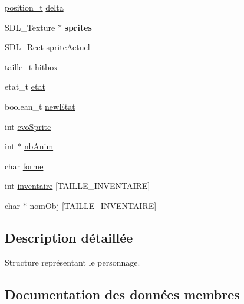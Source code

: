 \begin{DoxyCompactItemize}
\item 
\hyperlink{structposition__s}{position\+\_\+t} \hyperlink{structpersonnage__s_a09fb83af37953227050f9ced0410f032}{delta}
\item 
\mbox{\label{structpersonnage__s_a97da32596524755cba3ba76782ab0205}} 
S\+D\+L\+\_\+\+Texture $\ast$ {\bfseries sprites}
\item 
S\+D\+L\+\_\+\+Rect \hyperlink{structpersonnage__s_afa75822afebdaf61725b7f87c86d5922}{sprite\+Actuel}
\item 
\hyperlink{structtaille__s}{taille\+\_\+t} \hyperlink{structpersonnage__s_a4a6fd4db944c59eaf1c4006f7e0b533c}{hitbox}
\item 
etat\+\_\+t \hyperlink{structpersonnage__s_a2d91f0a1a2e44164875be806c7a456cc}{etat}
\item 
boolean\+\_\+t \hyperlink{structpersonnage__s_ad9c2e07633c2a40855b169b4b677009f}{new\+Etat}
\item 
int \hyperlink{structpersonnage__s_a47750ce89c5dcdb6844e0a98afd5fd75}{evo\+Sprite}
\item 
int $\ast$ \hyperlink{structpersonnage__s_a05aa3037a7469f58464094d2bd2d683a}{nb\+Anim}
\item 
char \hyperlink{structpersonnage__s_a1f1eb200420640259201a84300bccf7e}{forme}
\item 
int \hyperlink{structpersonnage__s_a0aefe070eb6c9c73fe6a40c909d2dc30}{inventaire} \mbox{[}T\+A\+I\+L\+L\+E\+\_\+\+I\+N\+V\+E\+N\+T\+A\+I\+RE\mbox{]}
\item 
char $\ast$ \hyperlink{structpersonnage__s_a6fc3c82b6c4f407289aa55155876c867}{nom\+Obj} \mbox{[}T\+A\+I\+L\+L\+E\+\_\+\+I\+N\+V\+E\+N\+T\+A\+I\+RE\mbox{]}
\end{DoxyCompactItemize}


\subsection{Description détaillée}
Structure représentant le personnage. 

\subsection{Documentation des données membres}
\mbox{\label{structpersonnage__s_a09fb83af37953227050f9ced0410f032}} 
